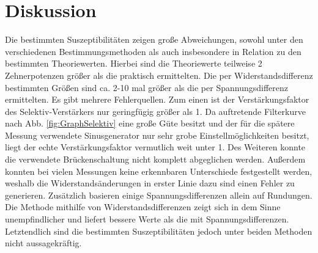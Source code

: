 
\section{Diskussion}
\label{sec:Diskussion}
Die bestimmten Suszeptibilitäten zeigen große Abweichungen, sowohl unter den
verschiedenen Bestimmungsmethoden als auch insbesondere in Relation zu den
bestimmten Theoriewerten. Hierbei sind die Theoriewerte teilweise 2
Zehnerpotenzen größer als die praktisch ermittelten. Die per Widerstandsdifferenz
bestimmten Größen sind ca. 2-10 mal größer als die per Spannungsdifferenz
ermittelten. Es gibt mehrere Fehlerquellen. Zum einen ist der Verstärkungsfaktor
des Selektiv-Verstärkers nur geringfügig größer als 1. Da auftretende Filterkurve nach
Abb. \ref{fig:GraphSelektiv} eine große Güte besitzt und der für die spätere
Messung verwendete Sinusgenerator nur sehr grobe Einstellmöglichkeiten besitzt,
liegt der echte Verstärkungsfaktor vermutlich weit unter 1. Des Weiteren konnte
die verwendete Brückenschaltung nicht komplett abgeglichen werden. Außerdem
konnten bei vielen Messungen keine erkennbaren Unterschiede festgestellt werden,
weshalb die Widerstandsänderungen in erster Linie dazu sind einen Fehler zu
generieren. Zusätzlich basieren einige Spannungsdifferenzen allein auf Rundungen.
Die Methode mithilfe von Widerstandsdifferenzen zeigt sich in dem Sinne
unempfindlicher und liefert bessere Werte als die mit Spannungsdifferenzen.
Letztendlich sind die bestimmten Suszeptibilitäten jedoch unter beiden Methoden nicht
aussagekräftig.
